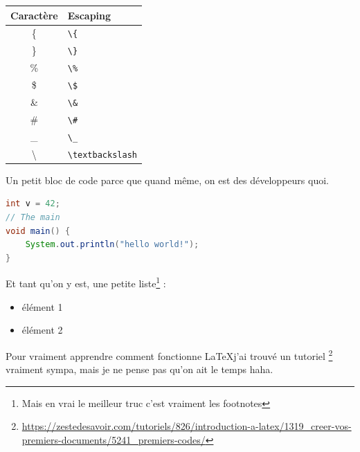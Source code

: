 \documentclass[french]{article}
\begin{document}
\begin{tabular}{ c l }
	Caractère & Escaping \\
	\hline
	\{ & \verb|\{| \\
	\} & \verb|\}| \\
	\% & \verb|\%| \\
	\$ & \verb|\$| \\
	\& & \verb|\&| \\
	\# & \verb|\#| \\
	\_ & \verb|\_| \\
	\textbackslash & \verb|\textbackslash|
\end{tabular}

\newpage
Un petit bloc de code parce que quand même, on est des développeurs quoi.
\begin{lstlisting}[language=java]
int v = 42;
// The main
void main() {
	System.out.println("hello world!");
}
\end{lstlisting}

Et tant qu'on y est, une petite liste\footnote{Mais en vrai le meilleur truc c'est vraiment les footnotes} :
\begin{itemize}
	\item élément 1
	\item élément 2
\end{itemize}

Pour vraiment apprendre comment fonctionne \LaTeX j'ai trouvé un tutoriel
\footnote{\raggedright\url{https://zestedesavoir.com/tutoriels/826/introduction-a-latex/1319_creer-vos-premiers-documents/5241_premiers-codes/}}
vraiment sympa, mais je ne pense pas qu'on ait le temps haha.
\end{document}
